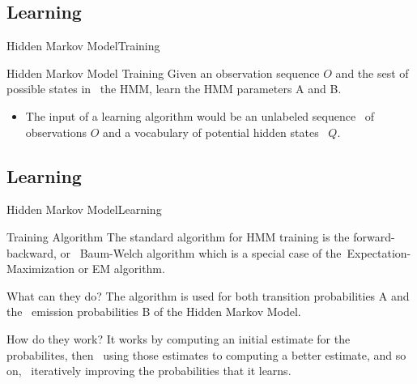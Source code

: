 \documentclass[10pt]{beamer}
\begin{document}
\subsection{Learning}
\begin{frame}{Hidden Markov Model}{Training}
    \begin{block}{Hidden Markov Model Training}
       Given an observation sequence $O$ and the sest of possible states in \
       the HMM, learn the HMM parameters A and B.
    \end{block}
    
    \begin{itemize}
       \item The input of a learning algorithm would be an unlabeled sequence \
             of observations $O$ and a vocabulary of potential hidden states \
             $Q$.
    \end{itemize}

\end{frame}

\subsection{Learning}
\begin{frame}{Hidden Markov Model}{Learning}
    \begin{block}{Training Algorithm}
        The standard algorithm for HMM training is the forward-backward, or \
        Baum-Welch algorithm which is a special case of the\
        Expectation-Maximization or EM algorithm.
    \end{block}
    \begin{block}{What can they do?}
        The algorithm is used for both transition probabilities A and the \
        emission probabilities B of the Hidden Markov Model.
    \end{block}
    \begin{block}{How do they work?}
        It works by computing an initial estimate for the probabilites, then \
        using those estimates to computing a better estimate, and so on, \
        iteratively improving the probabilities that it learns.
    \end{block}
\end{frame}
\end{document}
